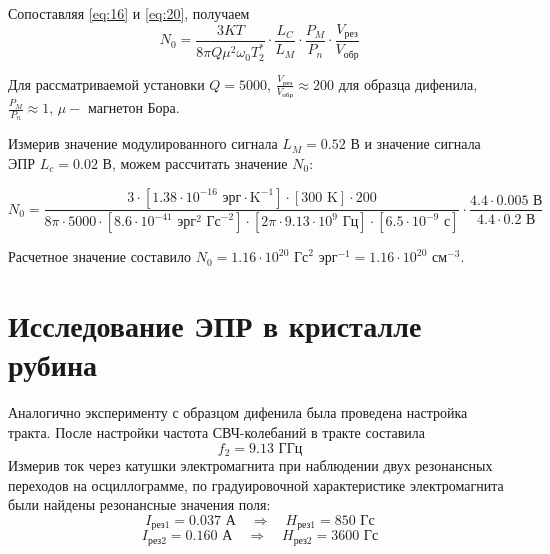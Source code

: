 \documentclass[a4paper,14pt]{extarticle}
\begin{document}
Сопоставляя \eqref{eq:16} и \eqref{eq:20}, получаем
\begin{equation}
    \label{eq:21}
    N_0 = \frac{3KT}{8\pi Q \mu^2 \omega_{0} T_2^*} \cdot \frac{L_C}{L_M}  \cdot \frac{P_M}{P_n} \cdot \frac{V_{\text{рез}}}{V_{\text{обр}}}
\end{equation}

Для рассматриваемой установки $Q=5000$, $\frac{V_\text{рез}}{V_\text{обр}} \approx 200$ для образца дифенила, $ \frac{P_M}{P_n}\approx1$, $\mu - \text{ магнетон Бора}$.

Измерив значение модулированного сигнала $L_M=0.52$ В и значение сигнала ЭПР $L_c=0.02$ В, можем рассчитать значение $N_0$:

\begin{equation}
  N_0 = \frac{3\cdot [1.38\cdot10^{-16} \text{ эрг}\cdot\text{K}^{-1}]\cdot [300 \text{ K}]\cdot 200}{8\pi \cdot 5000 \cdot [8.6\cdot 10^{-41} \text{ эрг}^2\text{ Гс}^{-2}]\cdot [2\pi\cdot 9.13\cdot 10^9 \text{ Гц} ]\cdot [6.5 \cdot 10^{-9} \text{ с}]}\cdot \frac{4.4\cdot 0.005 \text{ В}}{4.4\cdot 0.2 \text{ В}}
\end{equation}

Расчетное значение составило $N_0=1.16\cdot 10^{20} \text{ Гс}^2 \text{ эрг}^{-1}=1.16\cdot 10^{20} \text{ см}^{-3}$.


\section{Исследование ЭПР в кристалле рубина}

Аналогично эксперименту с образцом дифенила была проведена настройка тракта. После настройки частота СВЧ-колебаний в тракте составила
\begin{equation}
  f_2=9.13 \text{ ГГц}
\end{equation}
Измерив ток через катушки электромагнита при наблюдении двух резонансных переходов на осциллограмме, по градуировочной характеристике электромагнита были найдены резонансные значения поля:
\begin{equation}
  I_\text{рез1}=0.037 \text{ А}  \quad\Rightarrow\quad
  H_\text{рез1}=850 \text{ Гс}
\end{equation}
\begin{equation}
  I_\text{рез2}=0.160 \text{ А}  \quad\Rightarrow\quad
  H_\text{рез2}=3600 \text{ Гс}
\end{equation}

\end{document}
